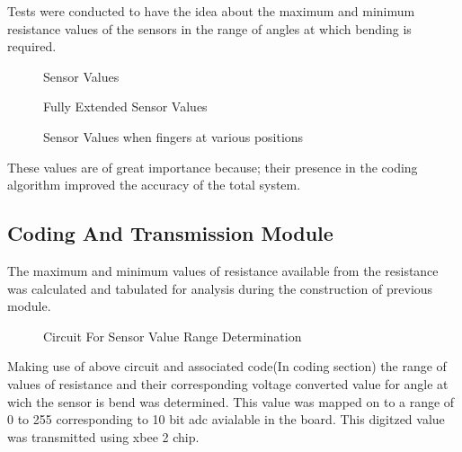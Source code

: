 \documentclass[a4paper, 12pt, notitlepage]{report}
\begin{document}
Tests were conducted to have the idea about the maximum and minimum resistance values of the sensors in the range of angles at which bending is required.\\

\begin{figure}[h!]
{\par}
\caption{Sensor Values}
\end{figure}

\begin{figure}[h!]
{\par}
\caption{Fully Extended Sensor Values}
\end{figure}

\begin{figure}[h!]
{\par}
\caption{Sensor Values when fingers at various positions}
\end{figure}

These values are of great importance because; their presence in the coding algorithm improved the accuracy of the total system.\\

\newpage
\newpage
\subsection{Coding And Transmission Module}

The maximum and minimum values of resistance available from the resistance was calculated and tabulated for analysis during the construction of previous module.\\
 
\begin{figure}[h!]
{\par}
\caption{Circuit For Sensor Value Range Determination}
\end{figure}

Making use of above circuit and associated code(In coding section) the range of values of resistance and their corresponding voltage converted value for angle at wich the sensor is bend was determined. This value was mapped on to a range of 0 to 255 corresponding to 10 bit adc avialable in the board. This digitzed value was transmitted using xbee 2 chip.\\
\end{document}

